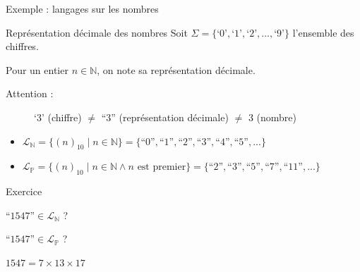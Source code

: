 
\begingroup

\begin{frame}{Exemple : langages sur les nombres}
  
  \begin{block}{Représentation décimale des nombres}
    Soit $\Sigma = \{\text{`0'}, \text{`1'}, \text{`2'}, ..., \text{`9'}\}$ l'ensemble des chiffres.
    
    Pour un entier $n \in \mathbb{N}$, on note  sa représentation décimale. 
    
    \begin{description}
    \item[\alert{Attention :}] `3' (chiffre) $\neq$ ``3'' (représentation décimale) $\neq$ 3 (nombre)
    \end{description}
    
    \begin{itemize}
    \item $\mathcal{L}_{\mathbb{N}} = \{(n)_{10} \mid n \in \mathbb{N}\} = \{\text{``0''},\text{``1''},\text{``2''},\text{``3''}, \text{``4''}, \text{``5''}, ...\}$
    \item<2-> $\mathcal{L}_{\mathbb{P}} = \{(n)_{10} \mid n \in \mathbb{N} \land n \text{ est premier}\} = \{\text{``2''},\text{``3''},\text{``5''}, \text{``7''}, \text{``11''}, ...\}$
    \end{itemize}
  \end{block}
  
  \vspace{3mm} 
  
  \begin{exampleblock}{Exercice}
    \begin{description}
    \item[Question :] $\text{``1547''} \in \mathcal{L}_{\mathbb{N}}$ ?
    \item<2->[Question :] $\text{``1547''} \in \mathcal{L}_{\mathbb{P}}$ ?
    \item<3->[Indication :] $1547 = 7 \times 13 \times 17$ 
    \end{description}
  \end{exampleblock}
  

\end{frame}

\endgroup
\endinput
